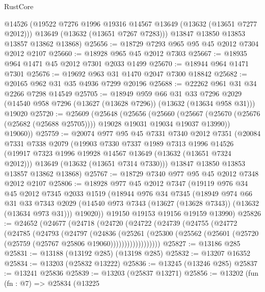 \begin{lexlean}{RustCore}
\begin{coremodule}
        @14526
        (@19522 @7276 @1996 @19316 @14567 @13649 (@13632 (@13651 @7277 @2012)))
        @13649
        (@13632 (@13651 @7267 @7283)))
      @13847
      @13850
      @13853
      @13857
      @13862
      @13868)
@25656 := @18729 @7293 @965 @95 @45 @2012 @7304 @2012 @2107
@25660 := @18928 @965 @45 @2012 @7303
@25667 := @18935 @964 @1471 @45 @2012 @7301 @2033 @1499
@25670 := @18944 @964 @1471 @7301
@25676 := @19692 @963 @31 @1470 @2047 @7300 @18842
@25682 := @20165 @962 @31 @35 @4936 @7299 @20196
@25688 := @22262 @961 @31 @34 @2266 @7298 @14549
@25705 := @18949
    @959
    @66
    @31
    @33
    @7296
    @2029
    (@14540 @958 @7296 (@13627 (@13628 @7296)) (@13632 (@13634 @958 @31)))
    @19020
@25720 := @25609
    (@25648
      (@25656
        (@25660
          (@25667 (@25670 (@25676 (@25682 (@25688 @25705)))) @19028 @19031 @19034 @19037 @13990))
        @19060))
@25759 := @20074
    @977
    @95
    @45
    @7331
    @7340
    @2012
    @7351
    (@20084
      @7331
      @7338
      @2079
      (@19903
        @7330
        @7337
        @1989
        @7313
        @1996
        @14526
        (@19917 @7323 @1996 @19928 @14567 @13649 (@13632 (@13651 @7324 @2012)))
        @13649
        (@13632 (@13651 @7314 @7330)))
      @13847
      @13850
      @13853
      @13857
      @13862
      @13868)
@25767 := @18729 @7340 @977 @95 @45 @2012 @7348 @2012 @2107
@25806 := @18928
    @977
    @45
    @2012
    @7347
    (@19119
      @976
      @34
      @45
      @2012
      @7345
      @2033
      @1519
      (@18944
        @976
        @34
        @7345
        (@18949
          @974
          @66
          @31
          @33
          @7343
          @2029
          (@14540 @973 @7343 (@13627 (@13628 @7343)) (@13632 (@13634 @973 @31)))
          @19020))
      @19150
      @19153
      @19156
      @19159
      @13990)
@25826 := @24652
    (@24677
      (@24718
        (@24720
          (@24722
            (@24739
              (@24755
                (@24772
                  (@24785
                    (@24793
                      (@24797
                        (@24836
                          (@25261
                            (@25300
                              (@25562
                                (@25601 (@25720 (@25759 (@25767 @25806 @19060))))))))))))))))))
@25827 := @13186 @285
@25831 := @13188 (@13192 @285) (@13198 @285)
@25832 := @13207 @16352
@25834 := @13203 (@25832 @13222)
@25836 := @13245 (@13246 @285)
@25837 := @13241 @25836
@25839 := @13203 (@25837 @13271)
@25856 := @13202
    (fun (fn : @7) =>
    @25834
      (@13225

\end{coremodule}
\end{lexlean}
